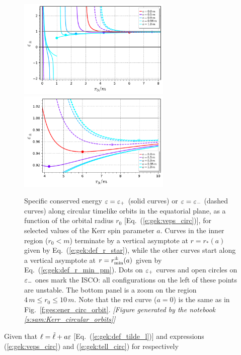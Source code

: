 \begin{figure}
\begin{center}
\includegraphics[width=0.65\textwidth]{gek_eps_circ_orb.pdf}\\
\includegraphics[width=0.65\textwidth]{gek_eps_circ_orb_zoom.pdf}
\end{center}
\caption[]{\label{f:gek:eps_circ_orb} \footnotesize
Specific conserved energy $\varepsilon=\varepsilon_+$ (solid curves) or $\varepsilon=\varepsilon_-$
(dashed curves) along circular timelike
orbits in the equatorial plane, as a function of the orbital radius $r_0$
[Eq.~(\ref{e:gek:veps_circ})], for selected values of the Kerr spin parameter $a$.
Curves in the inner region ($r_0 < m$) terminate by a vertical asymptote at $r = r_*(a)$ given
by Eq.~(\ref{e:gek:def_r_star}), while the other curves start along a
vertical asymptote at $r = r_{\rm min}^\pm(a)$ given by Eq.~(\ref{e:gek:def_r_min_pm}).
Dots on $\varepsilon_+$ curves and open circles on $\varepsilon_-$ ones mark the ISCO: all
configurations on the left of these points are unstable.
The bottom panel is a zoom on the region $4\,m \leq r_0 \leq 10\,m$.
Note that the red curve ($a=0$) is the same as in Fig.~\ref{f:ges:ener_circ_orbit}.
\textsl{[Figure generated by the notebook \ref{s:sam:Kerr_circular_orbits}]}
}
\end{figure}
Given that $\ell = \tilde{\ell} + a \varepsilon$ [Eq.~(\ref{e:gek:def_tilde_l})]
and expressions (\ref{e:gek:veps_circ}) and (\ref{e:gek:tell_circ}) for respectively
